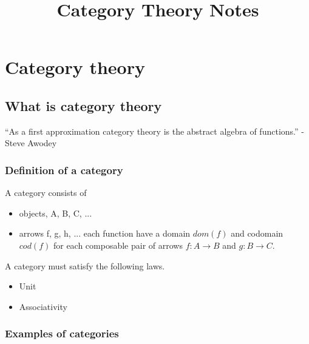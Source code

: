 \documentclass{book}
\title{Category Theory Notes}
\author{}
\theoremstyle{definition}
\newcommand{\arr}[3]{#1 : #2 \rightarrow #3}
\begin{document}
\maketitle

\tableofcontents
\newpage

\chapter{Category theory}

\section{What is category theory}

``As a first approximation category theory is the abstract algebra of
functions.'' - Steve Awodey

\subsection{Definition of a category}

A category consists of
\begin{itemize}
  \item objects, A, B, C, ...
  \item arrows f, g, h, ... each function have a domain $dom(f)$ and codomain
    $cod(f)$ for each composable pair of arrows $\arr{f}{A}{B}$ and
    $\arr{g}{B}{C}$.
\end{itemize}

A category must satisfy the following laws.
\begin{itemize}
  \item Unit
  \item Associativity
\end{itemize}

\subsection{Examples of categories}
\end{document}
